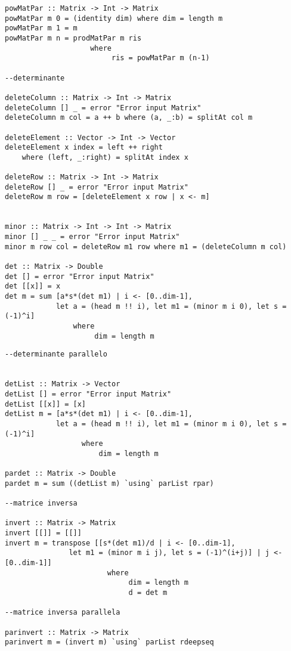 \newpage
\begin{verbatim}	  
powMatPar :: Matrix -> Int -> Matrix
powMatPar m 0 = (identity dim) where dim = length m
powMatPar m 1 = m
powMatPar m n = prodMatPar m ris
                    where
                         ris = powMatPar m (n-1)
		  
--determinante

deleteColumn :: Matrix -> Int -> Matrix
deleteColumn [] _ = error "Error input Matrix"
deleteColumn m col = a ++ b where (a, _:b) = splitAt col m
	
deleteElement :: Vector -> Int -> Vector
deleteElement x index = left ++ right
	where (left, _:right) = splitAt index x

deleteRow :: Matrix -> Int -> Matrix
deleteRow [] _ = error "Error input Matrix"
deleteRow m row = [deleteElement x row | x <- m]
						

minor :: Matrix -> Int -> Int -> Matrix
minor [] _ _ = error "Error input Matrix"
minor m row col = deleteRow m1 row where m1 = (deleteColumn m col)

det :: Matrix -> Double
det [] = error "Error input Matrix"
det [[x]] = x
det m = sum [a*s*(det m1) | i <- [0..dim-1], 
            let a = (head m !! i), let m1 = (minor m i 0), let s = (-1)^i] 
                where
                     dim = length m
\end{verbatim}
\newpage
\begin{verbatim}		
--determinante parallelo

		
detList :: Matrix -> Vector
detList [] = error "Error input Matrix"
detList [[x]] = [x]
detList m = [a*s*(det m1) | i <- [0..dim-1],
            let a = (head m !! i), let m1 = (minor m i 0), let s = (-1)^i] 
                  where
                      dim = length m
		
pardet :: Matrix -> Double
pardet m = sum ((detList m) `using` parList rpar)
		
--matrice inversa

invert :: Matrix -> Matrix
invert [[]] = [[]]
invert m = transpose [[s*(det m1)/d | i <- [0..dim-1],
               let m1 = (minor m i j), let s = (-1)^(i+j)] | j <- [0..dim-1]]
                        where
                             dim = length m
                             d = det m

--matrice inversa parallela			
			
parinvert :: Matrix -> Matrix			
parinvert m = (invert m) `using` parList rdeepseq
\end{verbatim}
\newpage
